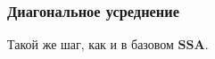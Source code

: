 \documentclass[a4paper, 11pt]{article}
\newcommand{\SSA}{\textbf{SSA}}
\newtheorem{comment}{Замечание} %
\begin{document}
\subsubsection{Диагональное усреднение}
Такой же шаг, как и в базовом $\SSA$.

\end{document}
